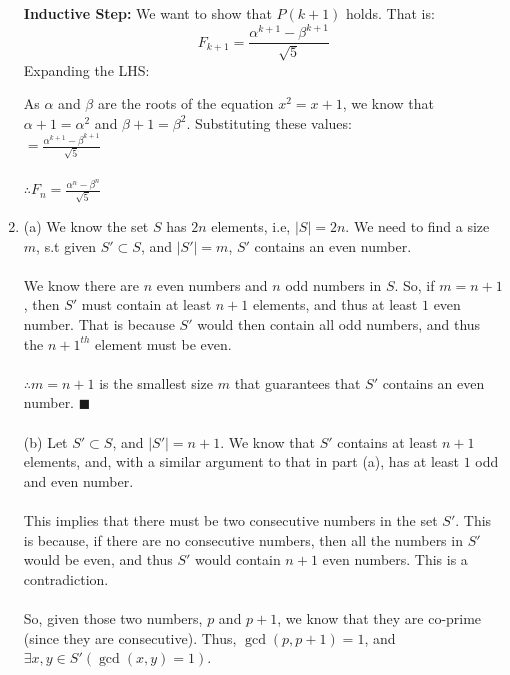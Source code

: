 \documentclass[a4paper]{article}
\begin{document}
\begin{enumerate}
\textbf{Inductive Step:} We want to show that $P(k+1)$ holds. That is:
$$F_{k+1} = \frac{\alpha^{k+1} - \beta^{k+1}}{\sqrt{5}}$$
Expanding the LHS:
As $\alpha$ and $\beta$ are the roots of the equation $x^2 = x + 1$, we know that $\alpha + 1 = \alpha^2$ and $\beta + 1 = \beta^2$. Substituting these values:\\
$= \frac{\alpha^{k+1} - \beta^{k+1}}{\sqrt{5}}$\\
\\
$\therefore F_n = \frac{\alpha^{n} - \beta^n}{\sqrt{5}}$\\

\item (a) We know the set $S$ has $2n$ elements, i.e, $|S| = 2n$. We need to find a size $m$, s.t given $S' \subset S$, and $|S'| = m$, $S'$ contains an even number. \\
\\
We know there are $n$ even numbers and $n$ odd numbers in $S$. So, if $m = n+1$, then $S'$ must contain at least $n+1$ elements, and thus at least $1$ even number. That is because $S'$ would then contain all odd numbers, and thus the $n + 1^{th}$ element must be even. \\
\\
$\therefore m = n+1$ is the smallest size $m$ that guarantees that $S'$ contains an even number. $\blacksquare$\\
\\
(b) Let $S' \subset S$, and $|S'| = n+1$. We know that $S'$ contains at least $n+1$ elements, and, with a similar argument to that in part (a), has at least $1$ odd and even number.\\
\\
This implies that there must be two consecutive numbers in the set $S'$. This is because, if there are no consecutive numbers, then all the numbers in $S'$ would be even, and thus $S'$ would contain $n+1$ even numbers. This is a contradiction.\\
\\
So, given those two numbers, $p$ and $p+1$, we know that they are co-prime (since they are consecutive). Thus, $\gcd(p, p+1) = 1$, and $\exists x,y \in S'(\gcd(x, y) = 1)$.\\
\end{enumerate}
\end{document}
